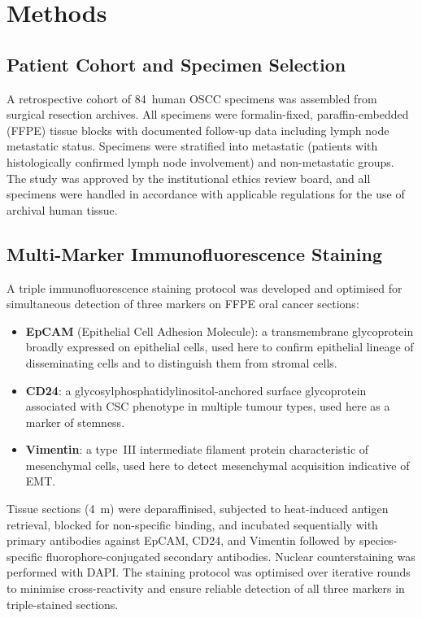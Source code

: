 \documentclass[11pt,a4paper]{article}
\begin{document}
\section{Methods}

\subsection{Patient Cohort and Specimen Selection}

A retrospective cohort of 84~human OSCC specimens was assembled from surgical resection archives. All specimens were formalin-fixed, paraffin-embedded (FFPE) tissue blocks with documented follow-up data including lymph node metastatic status. Specimens were stratified into metastatic (patients with histologically confirmed lymph node involvement) and non-metastatic groups. The study was approved by the institutional ethics review board, and all specimens were handled in accordance with applicable regulations for the use of archival human tissue.

\subsection{Multi-Marker Immunofluorescence Staining}

A triple immunofluorescence staining protocol was developed and optimised for simultaneous detection of three markers on FFPE oral cancer sections:

\begin{itemize}
    \item \textbf{EpCAM} (Epithelial Cell Adhesion Molecule): a transmembrane glycoprotein broadly expressed on epithelial cells, used here to confirm epithelial lineage of disseminating cells and to distinguish them from stromal cells.
    \item \textbf{CD24}: a glycosylphosphatidylinositol-anchored surface glycoprotein associated with CSC phenotype in multiple tumour types, used here as a marker of stemness.
    \item \textbf{Vimentin}: a type~III intermediate filament protein characteristic of mesenchymal cells, used here to detect mesenchymal acquisition indicative of EMT.
\end{itemize}

Tissue sections (4~\textmu{}m) were deparaffinised, subjected to heat-induced antigen retrieval, blocked for non-specific binding, and incubated sequentially with primary antibodies against EpCAM, CD24, and Vimentin followed by species-specific fluorophore-conjugated secondary antibodies. Nuclear counterstaining was performed with DAPI. The staining protocol was optimised over iterative rounds to minimise cross-reactivity and ensure reliable detection of all three markers in triple-stained sections.
\end{document}
